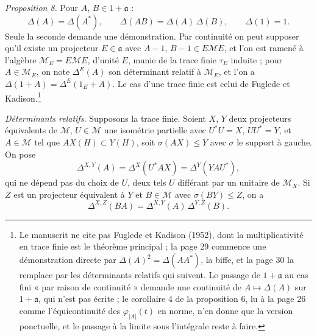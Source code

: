 \documentclass[11pt,a4paper]{article}
\begin{document}
\emph{Proposition 8.} Pour $A$, $B \in 1 + \mathfrak{a}$ :
\[
  \Delta(A) = \Delta(A^{*}), \qquad \Delta(AB) = \Delta(A)\,\Delta(B), \qquad
  \Delta(1) = 1 .
\]
Seule la seconde demande une démonstration. Par continuité on peut
supposer qu'il existe un projecteur $E \in \mathfrak{a}$ avec $A - 1$,
$B - 1 \in E\mathcal{M}E$, et l'on est ramené à l'algèbre
$\mathcal{M}_E = E\mathcal{M}E$, d'unité $E$, munie de la trace finie
$\tau_E$ induite ; pour $A \in \mathcal{M}_E$, on note $\Delta^{E}(A)$ son
déterminant relatif à $\mathcal{M}_E$, et l'on a $\Delta(1 + A) =
\Delta^{E}(1_E + A)$. Le cas d'une trace finie est celui de Fuglede et
Kadison.\footnote{Le manuscrit ne cite pas Fuglede et Kadison (1952), dont
la multiplicativité en trace finie est le théorème principal ; la page 29
commence une démonstration directe par $\Delta(A)^2 = \Delta(AA^{*})$, la
biffe, et la page 30 la remplace par les déterminants relatifs qui suivent.
Le passage de $1 + \mathfrak{a}$ au cas fini « par raison de continuité »
demande une continuité de $A \mapsto \Delta(A)$ sur $1 + \mathfrak{a}$, qui
n'est pas écrite ; le corollaire 4 de la proposition 6, lu à la page 26
comme l'équicontinuité des $\varphi_{|A|}(t)$ en norme, n'en donne que la
version ponctuelle, et le passage à la limite sous l'intégrale reste à
faire.}

\emph{Déterminants relatifs.} Supposons la trace finie. Soient $X$, $Y$ deux
projecteurs équivalents de $\mathcal{M}$, $U \in \mathcal{M}$ une isométrie
partielle avec $U^{*}U = X$, $UU^{*} = Y$, et $A \in \mathcal{M}$ tel que
$AX(H) \subset Y(H)$, soit $\sigma(AX) \leq Y$ avec $\sigma$ le support à
gauche. On pose
\[
  \Delta^{X,Y}(A) = \Delta^{X}(U^{*}AX) = \Delta^{Y}(YAU^{*}),
\]
qui ne dépend pas du choix de $U$, deux tels $U$ différant par un unitaire
de $\mathcal{M}_X$. Si $Z$ est un projecteur équivalent à $Y$ et $B \in
\mathcal{M}$ avec $\sigma(BY) \leq Z$, on a
\[
  \Delta^{X,Z}(BA) = \Delta^{X,Y}(A)\,\Delta^{Y,Z}(B) .
\]
\end{document}
